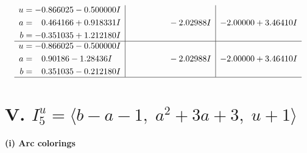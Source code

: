 \documentclass[1p]{elsarticle_modified}
\theoremstyle{definition}
\begin{document}
$$\begin{array}{c|c|c}
\begin{aligned}
u &= -0.866025 - 0.500000 I \\
a &= \phantom{-}0.464166 + 0.918331 I \\
b &= -0.351035 + 1.212180 I\end{aligned}
 & \phantom{-0.000000 } -2.02988 I & -2.00000 + 3.46410 I \\ \hline\begin{aligned}
u &= -0.866025 - 0.500000 I \\
a &= \phantom{-}0.90186 - 1.28436 I \\
b &= \phantom{-}0.351035 - 0.212180 I\end{aligned}
 & \phantom{-0.000000 } -2.02988 I & -2.00000 + 3.46410 I\\
 \hline 
 \end{array}$$\newpage\newpage\renewcommand{\arraystretch}{1}
\centering \section*{V. $I^u_{5}= \langle b- a-1,\;a^2+3 a+3,\;u+1 \rangle$}
\flushleft \textbf{(i) Arc colorings}\\
\end{document}
